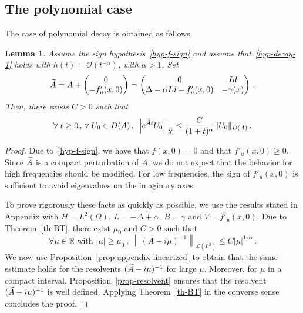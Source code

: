 \documentclass[10pt]{amsart}
\newtheorem{lemm}[theo]{Lemma}\newtheorem{prop}[theo]{Proposition}\newtheorem{coro}[theo]{Corollary}\newtheorem{conj}[theo]{Conjecture}
\theoremstyle{definition}\newtheorem{defi}[theo]{Definition}\newtheorem{rema}[theo]{Remark}\newtheorem{exam}[theo]{Example}\newtheorem{exem}[theo]{Example}\newtheorem{nota}[theo]{Notation}
\newcommand{\RR}{\mathbb{R}}
\newcommand{\Lc}{\mathcal{L}}
\newcommand{\Oc}{\mathcal{O}}
\let\oldtilde\tilde
\renewcommand*{\tilde}[1]{\mathchoice{\widetilde{#1}}{\widetilde{#1}}{\oldtilde{#1}}{\oldtilde{#1}}}\let\oldexists\exists
\renewcommand*{\exists}{\mathrel{\oldexists}}
\let\oldforall\forall
\renewcommand*{\forall}{\mathrel{\oldforall}}
\begin{document}
\subsection{The polynomial case}
The case of polynomial decay is obtained as follows.

\begin{lemm}\label{lemma-appli1}
Assume the sign hypothesis~\eqref{hyp-f-sign} and assume that~\eqref{hyp-decay-1} holds with $h(t)=\Oc(t^{-\alpha})$, with $\alpha>1$. Set
\[
\tilde A=A + 
\begin{pmatrix}
 0 \\
-f'_u(x,0)
\end{pmatrix}=
\begin{pmatrix}
0 & Id\\
\Delta-\alpha Id-f'_u(x,0) & -\gamma(x)
\end{pmatrix}\,.
\]
Then, there exists $C>0$ such that
\[
\forall t\geq 0\,,\,\forall U_0\in D(A)\,,\;\left\|e^{\tilde At} U_0\right\|_X \leq \frac
C{(1+t)^{\alpha}} \|U_0\|_{D(A)}\,.
\]
\end{lemm}


\begin{proof}
Due to~\eqref{hyp-f-sign}, we have that $f(x,0)=0$ and that $f'_u(x,0)\geq 0$. Since $\tilde A$ is a compact perturbation of $A$, we do not expect that the behavior for high frequencies should be modified. For low frequencies, the sign of $f'_u(x,0)$ is sufficient to avoid eigenvalues on the imaginary axes.

To prove rigorously these facts as quickly as possible, we use the results stated in Appendix with $H=L^2(\Omega)$, $L=-\Delta+\alpha$, $B=\gamma$ and $V=f'_u(x,0)$. Due to Theorem~\ref{th-BT}, there exist $\mu_0$ and $C>0$ such that
\[
\forall \mu\in\RR\text{ with }|\mu|\geq
\mu_0\,,\;\left\|(A-i\mu)^{-1}\right\|_{\Lc(L^2)}
\leq C {|\mu|^{1/\alpha}}\,.
\]
We now use Proposition~\ref{prop-appendix-linearized} to obtain that the same estimate holds for the resolvents $(\tilde A-i\mu)^{-1}$ for large $\mu$. Moreover, for $\mu$ in a compact interval, Proposition~\ref{prop-resolvent} ensures that the resolvent $(\tilde A-i\mu)^{-1}$ is well defined. Applying Theorem~\ref{th-BT} in the converse sense concludes the proof.
\end{proof}
\end{document}
